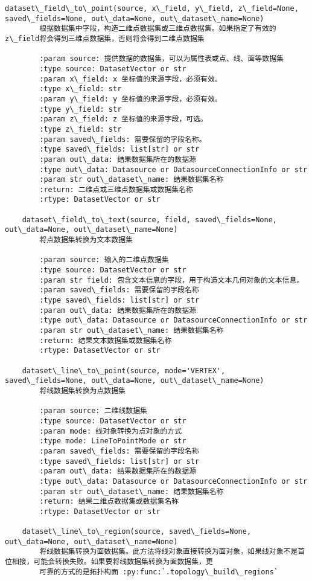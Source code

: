 \documentclass[11pt]{article}
\begin{document}
\begin{Verbatim}[commandchars=\\\{\}]
    dataset\_field\_to\_point(source, x\_field, y\_field, z\_field=None, saved\_fields=None, out\_data=None, out\_dataset\_name=None)
        根据数据集中字段，构造二维点数据集或三维点数据集。如果指定了有效的 z\_field将会得到三维点数据集，否则将会得到二维点数据集
        
        :param source: 提供数据的数据集，可以为属性表或点、线、面等数据集
        :type source: DatasetVector or str
        :param x\_field: x 坐标值的来源字段，必须有效。
        :type x\_field: str
        :param y\_field: y 坐标值的来源字段，必须有效。
        :type y\_field: str
        :param z\_field: z 坐标值的来源字段，可选。
        :type z\_field: str
        :param saved\_fields: 需要保留的字段名称。
        :type saved\_fields: list[str] or str
        :param out\_data: 结果数据集所在的数据源
        :type out\_data: Datasource or DatasourceConnectionInfo or str
        :param str out\_dataset\_name: 结果数据集名称
        :return: 二维点或三维点数据集或数据集名称
        :rtype: DatasetVector or str
    
    dataset\_field\_to\_text(source, field, saved\_fields=None, out\_data=None, out\_dataset\_name=None)
        将点数据集转换为文本数据集
        
        :param source: 输入的二维点数据集
        :type source: DatasetVector or str
        :param str field: 包含文本信息的字段，用于构造文本几何对象的文本信息。
        :param saved\_fields: 需要保留的字段名称
        :type saved\_fields: list[str] or str
        :param out\_data: 结果数据集所在的数据源
        :type out\_data: Datasource or DatasourceConnectionInfo or str
        :param str out\_dataset\_name: 结果数据集名称
        :return: 结果文本数据集或数据集名称
        :rtype: DatasetVector or str
    
    dataset\_line\_to\_point(source, mode='VERTEX', saved\_fields=None, out\_data=None, out\_dataset\_name=None)
        将线数据集转换为点数据集
        
        :param source: 二维线数据集
        :type source: DatasetVector or str
        :param mode: 线对象转换为点对象的方式
        :type mode: LineToPointMode or str
        :param saved\_fields: 需要保留的字段名称
        :type saved\_fields: list[str] or str
        :param out\_data: 结果数据集所在的数据源
        :type out\_data: Datasource or DatasourceConnectionInfo or str
        :param str out\_dataset\_name: 结果数据集名称
        :return: 结果二维点数据集或数据集名称
        :rtype: DatasetVector or str
    
    dataset\_line\_to\_region(source, saved\_fields=None, out\_data=None, out\_dataset\_name=None)
        将线数据集转换为面数据集。此方法将线对象直接转换为面对象，如果线对象不是首位相接，可能会转换失败。如果要将线数据集转换为面数据集，更
        可靠的方式的是拓扑构面 :py:func:`.topology\_build\_regions`
        

\end{Verbatim}
\end{document}
